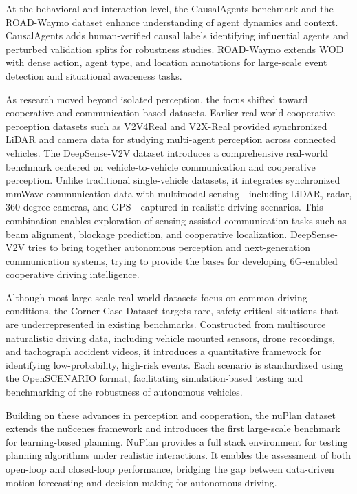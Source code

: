 At the behavioral and interaction level, the CausalAgents benchmark \cite{sun2024causalagents} and the ROAD-Waymo dataset \cite{khan2024road} enhance understanding of agent dynamics and context. CausalAgents adds human-verified causal labels identifying influential agents and perturbed validation splits for robustness studies. ROAD-Waymo extends WOD with dense action, agent type, and location annotations for large-scale event detection and situational awareness tasks.

As research moved beyond isolated perception, the focus shifted toward cooperative and communication-based datasets. Earlier real-world cooperative perception datasets such as V2V4Real \cite{Xu_2023_CVPR} and V2X-Real \cite{10.1007/978-3-031-72943-0_26} provided synchronized LiDAR and camera data for studying multi-agent perception across connected vehicles. The DeepSense-V2V dataset \cite{11029591} introduces a comprehensive real-world benchmark centered on vehicle-to-vehicle communication and cooperative perception. Unlike traditional single-vehicle datasets, it integrates synchronized mmWave communication data with multimodal sensing—including LiDAR, radar, 360-degree cameras, and GPS—captured in realistic driving scenarios. This combination enables exploration of sensing-assisted communication tasks such as beam alignment, blockage prediction, and cooperative localization. DeepSense-V2V tries to bring together autonomous perception and next-generation communication systems, trying to provide the bases for developing 6G-enabled cooperative driving intelligence.

Although most large-scale real-world datasets focus on common driving conditions, the Corner Case Dataset \cite{smartcities8040129} targets rare, safety-critical situations that are underrepresented in existing benchmarks. Constructed from multisource naturalistic driving data, including vehicle mounted sensors, drone recordings, and tachograph accident videos, it introduces a quantitative framework for identifying low-probability, high-risk events. Each scenario is standardized using the OpenSCENARIO format, facilitating simulation-based testing and benchmarking of the robustness of autonomous vehicles. 

Building on these advances in perception and cooperation, the nuPlan dataset \cite{10610077} extends the nuScenes framework and introduces the first large-scale benchmark for learning-based planning. 
NuPlan provides a full stack environment for testing planning algorithms under realistic interactions. It enables the assessment of both open-loop and closed-loop performance, bridging the gap between data-driven motion forecasting and decision making for autonomous driving.



